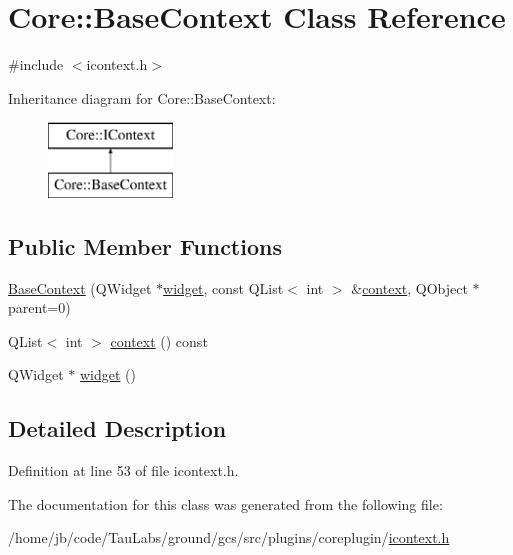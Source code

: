 \hypertarget{class_core_1_1_base_context}{\section{\-Core\-:\-:\-Base\-Context \-Class \-Reference}
\label{class_core_1_1_base_context}
}


{\ttfamily \#include $<$icontext.\-h$>$}

\-Inheritance diagram for \-Core\-:\-:\-Base\-Context\-:\begin{figure}[H]
\begin{center}
\leavevmode
\includegraphics[height=2.000000cm]{class_core_1_1_base_context}
\end{center}
\end{figure}
\subsection*{\-Public \-Member \-Functions}
\begin{DoxyCompactItemize}
\item 
\hyperlink{group___core_plugin_gac11e47d56487082f8fb09d4b700f5dfb}{\-Base\-Context} (\-Q\-Widget $\ast$\hyperlink{group___core_plugin_ga4aa83aa72d1e46f3c0011bac0b1ae9ca}{widget}, const \-Q\-List$<$ int $>$ \&\hyperlink{group___core_plugin_ga955c8501de749dd5e235762cf13bc9fb}{context}, \-Q\-Object $\ast$parent=0)
\item 
\-Q\-List$<$ int $>$ \hyperlink{group___core_plugin_ga955c8501de749dd5e235762cf13bc9fb}{context} () const 
\item 
\-Q\-Widget $\ast$ \hyperlink{group___core_plugin_ga4aa83aa72d1e46f3c0011bac0b1ae9ca}{widget} ()
\end{DoxyCompactItemize}


\subsection{\-Detailed \-Description}


\-Definition at line 53 of file icontext.\-h.



\-The documentation for this class was generated from the following file\-:\begin{DoxyCompactItemize}
\item 
/home/jb/code/\-Tau\-Labs/ground/gcs/src/plugins/coreplugin/\hyperlink{icontext_8h}{icontext.\-h}\end{DoxyCompactItemize}
